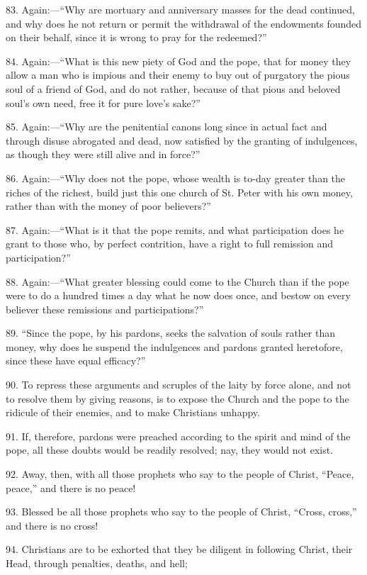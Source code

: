 83. Again:—``Why are mortuary and anniversary masses for the dead
continued, and why does he not return or permit the withdrawal of the
endowments founded on their behalf, since it is wrong to pray for the
redeemed?''

84. Again:—``What is this new piety of God and the pope, that for money
they allow a man who is impious and their enemy to buy out of purgatory
the pious soul of a friend of God, and do not rather, because of that
pious and beloved soul's own need, free it for pure love's sake?''

85. Again:—``Why are the penitential canons long since in actual fact
and through disuse abrogated and dead, now satisfied by the granting of
indulgences, as though they were still alive and in force?''

86. Again:—``Why does not the pope, whose wealth is to-day greater than
the riches of the richest, build just this one church of St. Peter with
his own money, rather than with the money of poor believers?''

87. Again:—``What is it that the pope remits, and what participation
does he grant to those who, by perfect contrition, have a right to full
remission and participation?''

88. Again:—``What greater blessing could come to the Church than if the
pope were to do a hundred times a day what he now does once, and bestow
on every believer these remissions and participations?''

89. ``Since the pope, by his pardons, seeks the salvation of souls
rather than money, why does he suspend the indulgences and pardons
granted heretofore, since these have equal efficacy?''

90. To repress these arguments and scruples of the laity by force
alone, and not to resolve them by giving reasons, is to expose the
Church and the pope to the ridicule of their enemies, and to make
Christians unhappy.

91. If, therefore, pardons were preached according to the spirit and
mind of the pope, all these doubts would be readily resolved; nay, they
would not exist.

92. Away, then, with all those prophets who say to the people of
Christ, ``Peace, peace,'' and there is no peace!

93. Blessed be all those prophets who say to the people of Christ,
``Cross, cross,'' and there is no cross!

94. Christians are to be exhorted that they be diligent in following
Christ, their Head, through penalties, deaths, and hell;

